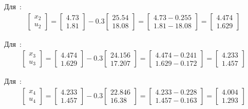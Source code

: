 \begin{enumerate}
	Для \,:
	\begin{align*}
		\begin{bmatrix}
			x_{2} \\ u_{2}
		\end{bmatrix}
		=
		\begin{bmatrix}
			4.73 \\
			1.81
		\end{bmatrix}
		-
		0.3
		\begin{bmatrix}
			25.54 \\
			18.08
		\end{bmatrix}
		=
		\begin{bmatrix}
			4.73 - 0.255\\
			1.81 - 18.08
		\end{bmatrix}
		= 
		\begin{bmatrix}
			4.474 \\
			1.629
		\end{bmatrix}	
	\end{align*}
	
	Для \,:
	\begin{align*}
		\begin{bmatrix}
		x_{3} \\ u_{3}
		\end{bmatrix}
		=
		\begin{bmatrix}
			4.474 \\
			1.629
		\end{bmatrix}
		-
		0.3
		\begin{bmatrix}
			24.156 \\
			17.207
		\end{bmatrix}
		=
		\begin{bmatrix}
			4.474 - 0.241\\
			1.629 - 0.172
		\end{bmatrix}
		= 
		\begin{bmatrix}
			4.233 \\
			1.457
		\end{bmatrix}	
	\end{align*}
	
	Для \,:
	\begin{align*}
		\begin{bmatrix}
			x_{4} \\ u_{4}
		\end{bmatrix}
		=
		\begin{bmatrix}
			4.233 \\
			1.457
		\end{bmatrix}
		-
		0.3
		\begin{bmatrix}
			22.846 \\
			16.38
		\end{bmatrix}
		=
		\begin{bmatrix}
			4.233 - 0.228 \\
			1.457 - 0.163
		\end{bmatrix}
		= 
		\begin{bmatrix}
			4.004 \\
			1.293
		\end{bmatrix}	
	\end{align*}
	

\end{enumerate}
